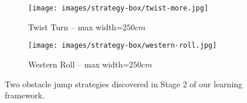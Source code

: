 \begin{figure}
    \centering
    \begin{subfigure}[b]{0.99\linewidth}
        \texttt{[image: images/strategy-box/twist-more.jpg]}
        \caption{Twist Turn -- max width=$250cm$}
        \label{fig:obstacle-twistTurn}
    \end{subfigure}
    \begin{subfigure}[b]{0.99\linewidth}
        \texttt{[image: images/strategy-box/western-roll.jpg]}
        \caption{Western Roll -- max width=$250cm$}
        \label{fig:obstacle-roll}
    \end{subfigure}
    \caption{Two obstacle jump strategies discovered in Stage 2 of our learning framework.}
    \label{fig:obstacleJumps2}
\end{figure}